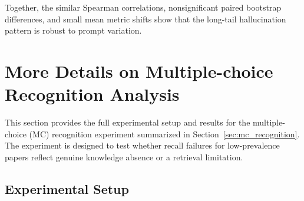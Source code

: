 \documentclass[11pt]{article}
\begin{document}
\setlength{\tabcolsep}{0.5pt}
\begin{table}[tb!]
  \centering
  \captionsetup{font=small}
  \footnotesize

  \caption{Mean metric values and absolute differences from baseline across different prompt variants.}
  \label{tab:mean_prompt}
\end{table}

Together, the similar Spearman correlations, nonsignificant paired bootstrap differences, and small mean metric shifts show that the long-tail hallucination pattern is robust to prompt variation.

\section{More Details on Multiple-choice Recognition Analysis}
\label{sec:appendix_mc_recognition}

This section provides the full experimental setup and results for the multiple-choice (MC) recognition experiment summarized  in Section~\ref{sec:mc_recognition}. The experiment is designed to test whether recall failures for low-prevalence papers reflect genuine knowledge absence or a retrieval limitation.

\subsection{Experimental Setup}
\end{document}
